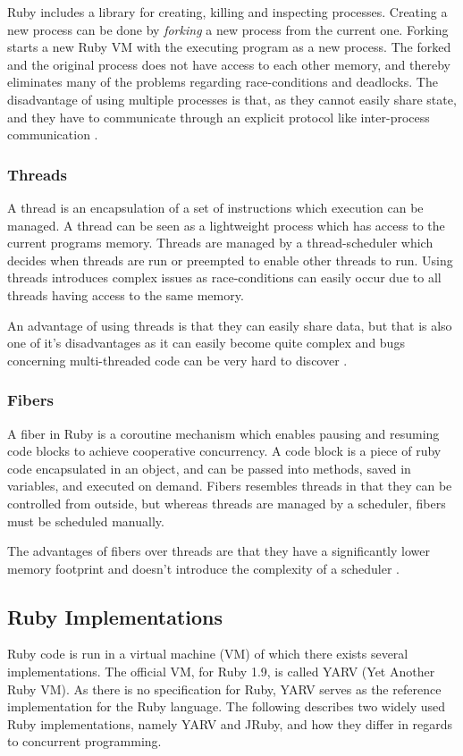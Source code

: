 Ruby includes a library for creating, killing and inspecting processes.
Creating a new process can be done by \textit{forking} a new process from the
current one. Forking starts a new Ruby VM with the executing program as a new
process. The forked and the original process does not have access to each
other memory, and thereby eliminates many of the problems regarding
race-conditions and deadlocks. The disadvantage of using multiple processes is
that, as they cannot easily share state, and they have to communicate through an explicit
protocol like inter-process communication \cite{ruby19}.

\subsubsection{Threads}
A thread is an encapsulation of a set of instructions which execution can
be managed. A thread can be seen as a lightweight process which has access to
the current programs memory. Threads are managed by a thread-scheduler which
decides when threads are run or preempted to enable other threads to
run. Using threads introduces complex issues as race-conditions can easily
occur due to all threads having access to the same memory.

An advantage of using threads is that they can easily share data, but that
is also one of it's disadvantages as it can easily become quite complex and
bugs concerning multi-threaded code can be very hard to discover
\cite{ruby19}.

\subsubsection{Fibers}
A fiber in Ruby is a coroutine mechanism which enables pausing and resuming
code blocks to achieve cooperative concurrency. A code block is a
piece of ruby code encapsulated in an object, and can be passed into
methods, saved in variables, and executed on demand. Fibers resembles threads in
that they can be controlled from outside, but whereas threads are managed by a
scheduler, fibers must be scheduled manually.

The advantages of fibers over threads are that they have a significantly lower
memory footprint and doesn't introduce the complexity of a scheduler \cite{rubyfiber}.

\subsection{Ruby Implementations}
Ruby code is run in a virtual machine (VM) of which there exists several
implementations. The official VM, for Ruby 1.9, is called YARV (Yet
Another Ruby VM). As there is no specification for Ruby, YARV serves as
the reference implementation for the Ruby language. The following describes
two widely used Ruby implementations, namely YARV and JRuby, and how they
differ in regards to concurrent programming.

